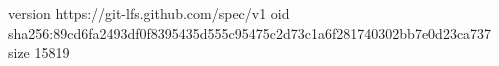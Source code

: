 version https://git-lfs.github.com/spec/v1
oid sha256:89cd6fa2493df0f8395435d555c95475c2d73c1a6f281740302bb7e0d23ca737
size 15819
